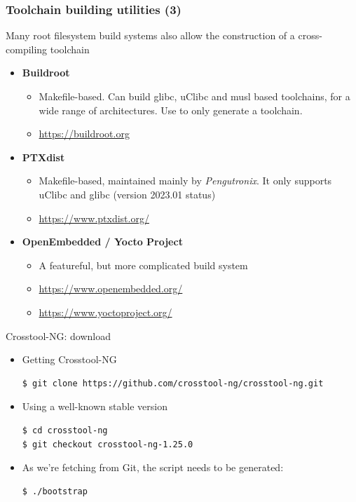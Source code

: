 \begin{frame}
\frametitle{Toolchain building utilities (3)}
Many root filesystem build systems also allow the construction of
a cross-compiling toolchain
\begin{itemize}
\item {\bf Buildroot}
  \begin{itemize}
  \item Makefile-based. Can build glibc, uClibc and musl based
    toolchains, for a wide range of architectures. Use 
    to only generate a toolchain.
  \item \url{https://buildroot.org}
  \end{itemize}
\item {\bf PTXdist}
  \begin{itemize}
  \item Makefile-based, maintained mainly by {\em Pengutronix}. It only
        supports uClibc and glibc (version 2023.01 status)
  \item \url{https://www.ptxdist.org/}
  \end{itemize}
\item {\bf OpenEmbedded / Yocto Project}
  \begin{itemize}
  \item A featureful, but more complicated build system
  \item \url{https://www.openembedded.org/}
  \item \url{https://www.yoctoproject.org/}
  \end{itemize}
\end{itemize}
\end{frame}

\begin{frame}[fragile]{Crosstool-NG: download}
  \begin{itemize}
  \item Getting Crosstool-NG
\begin{verbatim}
$ git clone https://github.com/crosstool-ng/crosstool-ng.git
\end{verbatim}
  \item Using a well-known stable version
\begin{verbatim}
$ cd crosstool-ng
$ git checkout crosstool-ng-1.25.0
\end{verbatim}
  \item As we're fetching from Git, the  script needs
    to be generated:
\begin{verbatim}
$ ./bootstrap
\end{verbatim}
  \end{itemize}
\end{frame}

